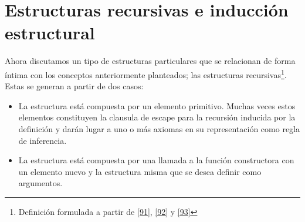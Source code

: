 \begin{exercise}
\begin{turn}{90}
\end{turn}
    \end{exercise}


\section{Estructuras recursivas e inducción estructural}

    Ahora discutamos un tipo de estructuras particulares que se relacionan de forma íntima con los conceptos anteriormente planteados; las estructuras recursivas\footnote{Definición formulada a partir de \hyperlink{91}{[91]}, \hyperlink{92}{[92]} y \hyperlink{93}{[93]}}. Estas se generan a partir de dos casos:
    \begin{itemize}
 
        \item La estructura está compuesta por un elemento primitivo. Muchas veces estos elementos constituyen la clausula de escape para la recursión inducida por la definición y darán lugar a uno o más axiomas en su representación como regla de inferencia.
        \item La estructura está compuesta por una llamada a la función constructora con un elemento nuevo y la estructura misma que se desea definir como argumentos. 
    \end{itemize}


